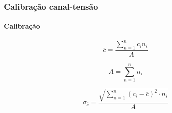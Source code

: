 \documentclass[10pt]{beamer}
\begin{document}
\begin{frame}\frametitle{Calibração canal-tensão}\framesubtitle{Calibração}

\begin{equation}
\overline{c}=\frac{\sum\limits_{n=1}^n c_{i}n_{i}}{A}
\label{centroide}
\end{equation}


\begin{equation}
A=\sum\limits_{n=1}^n n_{i}
\end{equation}


\begin{equation}
\sigma_{\overline{c}}=\frac{\sqrt{\sum\limits_{n=1}^n (c_{i}-\overline{c})^2 \cdot n_{i}    }}{A}
\label{e_centroide}
\end{equation}

\end{frame}
\end{document}
